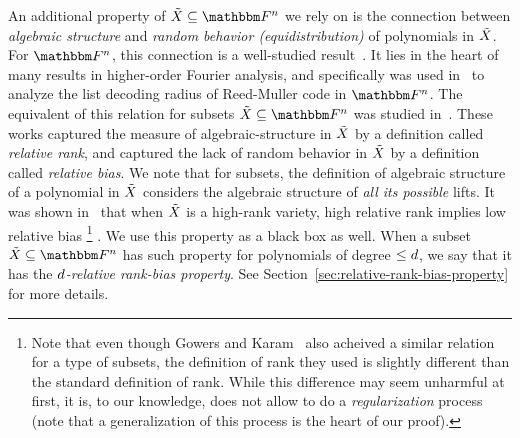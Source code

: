 An additional property of $\variety \subseteq \field$ we rely on is the connection between \emph{algebraic structure} and \emph{random behavior (equidistribution)} of polynomials in ${\tilde{X}}$.
\newline
For $\field$, this connection is a well-studied result~\cite{green2007distribution, kaufman2008worst, DBLP:journals/corr/0001L15}.
It lies in the heart of many results in higher-order Fourier analysis,
and specifically was used in~\cite{bhowmick2014list} to analyze the list decoding radius of Reed-Muller code in $\field$.
\newline
The equivalent of this relation for subsets $\variety \subseteq \field$ was studied in~\cite{lampert2021relative, gowers2022equidistributionhighrankpolynomialsvariables}.
These works captured the measure of algebraic-structure in ${\tilde{X}}$ by a definition called \emph{relative rank},
and captured the lack of random behavior in ${\tilde{X}}$ by a definition called \emph{relative bias}.
We note that for subsets, the definition of algebraic structure of a polynomial in ${\tilde{X}}$ considers the algebraic structure of \emph{all its possible} lifts.
It was shown in~\cite{lampert2021relative} that when ${\tilde{X}}$ is a high-rank variety, high relative rank implies low relative bias
\footnote{
    Note that even though Gowers and Karam~\cite{gowers2022equidistributionhighrankpolynomialsvariables} also acheived a similar relation for a type of subsets,
    the definition of rank they used is slightly different than the standard definition of rank.
    While this difference may seem unharmful at first, it is, to our knowledge, does not allow to do a \emph{regularization} process
    (note that a generalization of this process is the heart of our proof).
}
.
\newline
We use this property as a black box as well.
When a subset $\variety \subseteq \field$ has such property for polynomials of degree $\leq d$, we say that it has the \emph{$d$-relative rank-bias property}.
See Section~\ref{sec:relative-rank-bias-property} for more details.


